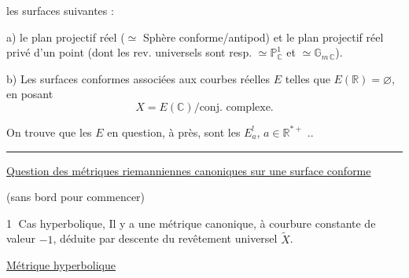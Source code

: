 
les surfaces suivantes :

a) le plan projectif réel ($\simeq$ Sphère conforme/antipod) et le plan projectif réel privé d'un point (dont les rev. universels sont resp. $\simeq\mathbb P^1_{\mathbb C}$ et $\simeq\mathbb G_{m\,\mathbb C}$).

b) Les surfaces conformes associées aux courbes  réelles $E$  telles que $E(\mathbb R)=\varnothing$, en posant 
\[
X=E(\mathbb C)/\text{conj. complexe}.
\]

On trouve que les $E$ en question, à  près, sont les $E_a^{!}$, $a\in\mathbb R^{*+}$ ..

\noindent\rule{\linewidth}{.35pt}

\uline{Question des métriques riemanniennes canoniques sur une surface conforme}

(sans bord pour commencer)

\textcircled{1} Cas hyperbolique, Il y a une métrique canonique, à courbure constante de valeur $-1$, déduite par descente du revêtement universel $\widetilde X$.

\uline{Métrique hyperbolique}
